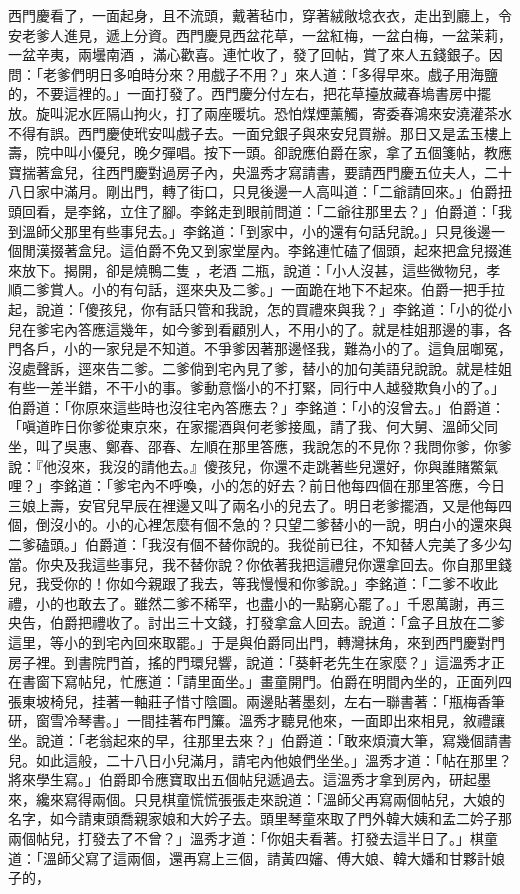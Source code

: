 西門慶看了，一面起身，且不流頭，戴著毡巾，穿著絨敞埝衣衣，走出到廳上，令安老爹人進見，遞上分資。西門慶見西盆花草，一盆紅梅，一盆白梅，一盆茉莉，一盆辛夷，兩壜南酒 ，滿心歡喜。連忙收了，發了回帖，賞了來人五錢銀子。因問：「老爹們明日多咱時分來？用戲子不用？」來人道：「多得早來。戲子用海鹽的，不要這裡的。」一面打發了。西門慶分付左右，把花草擡放藏春塢書房中擺放。旋叫泥水匠隔山拘火，打了兩座暖坑。恐怕煤煙薰觸，寄委春鴻來安澆灌茶水不得有誤。西門慶使玳安叫戲子去。一面兌銀子與來安兒買辦。那日又是孟玉樓上壽，院中叫小優兒，晚夕彈唱。按下一頭。卻說應伯爵在家，拿了五個箋帖，教應寶揣著盒兒，往西門慶對過房子內，央溫秀才寫請書，要請西門慶五位夫人，二十八日家中滿月。剛出門，轉了街口，只見後邊一人高叫道：「二爺請回來。」伯爵扭頭回看，是李銘，立住了腳。李銘走到眼前問道：「二爺往那里去？」伯爵道：「我到溫師父那里有些事兒去。」李銘道：「到家中，小的還有句話兒說。」只見後邊一個閒漢掇著盒兒。這伯爵不免又到家堂屋內。李銘連忙磕了個頭，起來把盒兒掇進來放下。揭開，卻是燒鴨二隻 ，老酒 二瓶，說道：「小人沒甚，這些微物兒，孝順二爹賞人。小的有句話，逕來央及二爹。」一面跪在地下不起來。伯爵一把手拉起，說道：「傻孩兒，你有話只管和我說，怎的買禮來與我？」李銘道：「小的從小兒在爹宅內答應這幾年，如今爹到看顧別人，不用小的了。就是桂姐那邊的事，各門各戶，小的一家兒是不知道。不爭爹因著那邊怪我，難為小的了。這負屈啣冤，沒處聲訴，逕來告二爹。二爹倘到宅內見了爹，替小的加句美語兒說說。就是桂姐有些一差半錯，不干小的事。爹動意惱小的不打緊，同行中人越發欺負小的了。」伯爵道：「你原來這些時也沒往宅內答應去？」李銘道：「小的沒曾去。」伯爵道：「嗔道昨日你爹從東京來，在家擺酒與何老爹接風，請了我、何大舅、溫師父同坐，叫了吳惠、鄭春、邵春、左順在那里答應，我說怎的不見你？我問你爹，你爹說：『他沒來，我沒的請他去。』傻孩兒，你還不走跳著些兒還好，你與誰賭鱉氣哩？」李銘道：「爹宅內不呼喚，小的怎的好去？前日他每四個在那里答應，今日三娘上壽，安官兒早辰在裡邊又叫了兩名小的兒去了。明日老爹擺酒，又是他每四個，倒沒小的。小的心裡怎麼有個不急的？只望二爹替小的一說，明白小的還來與二爹磕頭。」伯爵道：「我沒有個不替你說的。我從前已往，不知替人完美了多少勾當。你央及我這些事兒，我不替你說？你依著我把這禮兒你還拿回去。你自那里錢兒，我受你的！你如今親跟了我去，等我慢慢和你爹說。」李銘道：「二爹不收此禮，小的也敢去了。雖然二爹不稀罕，也盡小的一點窮心罷了。」千恩萬謝，再三央告，伯爵把禮收了。討出三十文錢，打發拿盒人回去。說道：「盒子且放在二爹這里，等小的到宅內回來取罷。」于是與伯爵同出門，轉灣抹角，來到西門慶對門房子裡。到書院門首，搖的門環兒響，說道：「葵軒老先生在家麼？」這溫秀才正在書窗下寫帖兒，忙應道：「請里面坐。」畫童開門。伯爵在明間內坐的，正面列四張東坡椅兒，挂著一軸莊子惜寸陰圖。兩邊貼著墨刻，左右一聯書著：「瓶梅香筆研，窗雪冷琴書。」一間挂著布門簾。溫秀才聽見他來，一面即出來相見，敘禮讓坐。說道：「老翁起來的早，往那里去來？」伯爵道：「敢來煩瀆大筆，寫幾個請書兒。如此這般，二十八日小兒滿月，請宅內他娘們坐坐。」溫秀才道：「帖在那里？將來學生寫。」伯爵即令應寶取出五個帖兒遞過去。這溫秀才拿到房內，研起墨來，纔來寫得兩個。只見棋童慌慌張張走來說道：「溫師父再寫兩個帖兒，大娘的名字，如今請東頭喬親家娘和大妗子去。頭里琴童來取了門外韓大姨和孟二妗子那兩個帖兒，打發去了不曾？」溫秀才道：「你姐夫看著。打發去這半日了。」棋童道：「溫師父寫了這兩個，還再寫上三個，請黃四嬸、傅大娘、韓大嬏和甘夥計娘子的，